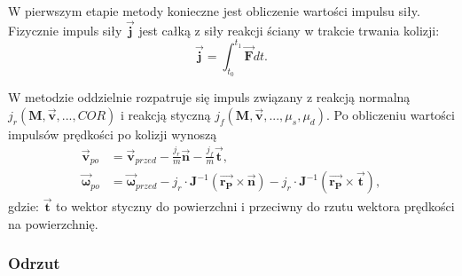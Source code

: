 W pierwszym etapie metody konieczne jest obliczenie wartości impulsu siły. Fizycznie impuls siły $\bm{\vec{j}}$ jest całką z siły reakcji ściany w trakcie trwania kolizji:
\[
	 \bm{\vec{j}} = \int_{t_0}^{t_1} \bm{\vec{F}} dt.
\]

W metodzie oddzielnie rozpatruje się impuls związany z reakcją normalną\\ $j_r \left( \bm{M}, \bm{\vec{v}}, ...  , COR \right)$ i reakcją styczną $j_f \left( \bm{M}, \bm{\vec{v}}, ...  , \mu_s, \mu_d \right)$. Po obliczeniu wartości impulsów prędkości po kolizji wynoszą 
\[
	\begin{aligned}
	\bm{\vec{v}}_{po} & = \bm{\vec{v}}_{przed} - \frac{j_r}{m} \bm{\vec{n}} - \frac{j_f}{m} \bm{\vec{t}},  \\
	\bm{\vec{\omega}}_{po} & = \bm{\vec{\omega}}_{przed} - j_r \cdot \bm{J}^{-1} \left(  \bm{\vec{r_P}} \times \bm{\vec{n}} \right) - j_r \cdot \bm{J}^{-1} \left(  \bm{\vec{r_P}} \times \bm{\vec{t}} \right),
	\end{aligned}
\]
gdzie: $\bm{\vec{t}}$ to wektor styczny do powierzchni i przeciwny do rzutu wektora prędkości na powierzchnię.

\subsubsection{Odrzut}

